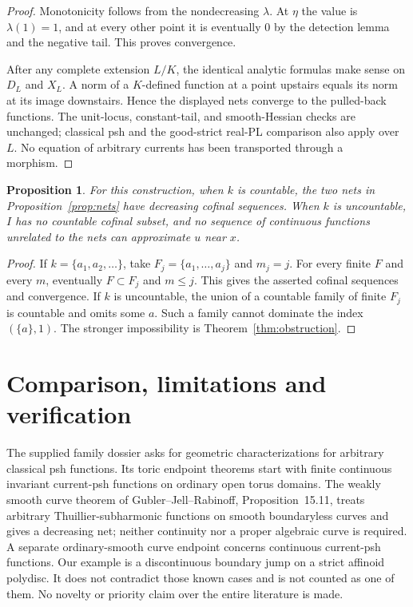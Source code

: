 \documentclass[11pt]{article}
\newtheorem{proposition}[theorem]{Proposition}
\begin{document}
\begin{proof}
Monotonicity follows from the nondecreasing $\lambda$. At $\eta$ the
value is $\lambda(1)=1$, and at every other point it is eventually $0$
by the detection lemma and the negative tail. This proves convergence.

After any complete extension $L/K$, the identical analytic formulas
make sense on $D_L$ and $X_L$. A norm of a $K$-defined function at a
point upstairs equals its norm at its image downstairs. Hence the
displayed nets converge to the pulled-back functions. The unit-locus,
constant-tail, and smooth-Hessian checks are unchanged; classical psh
and the good-strict real-PL comparison also apply over $L$. No equation
of arbitrary currents has been transported through a morphism.
\end{proof}

\begin{proposition}\label{prop:threshold}
For this construction, when $k$ is countable, the two nets in
Proposition~\ref{prop:nets} have decreasing cofinal sequences. When $k$
is uncountable, $I$ has no countable cofinal subset, and no sequence of
continuous functions unrelated to the nets can approximate $u$ near $x$.
\end{proposition}
\begin{proof}
If $k=\{a_1,a_2,\ldots\}$, take $F_j=\{a_1,\ldots,a_j\}$ and $m_j=j$.
For every finite $F$ and every $m$, eventually $F\subset F_j$ and
$m\le j$. This gives the asserted cofinal sequences and convergence.
If $k$ is uncountable, the union of a countable family of finite $F_j$
is countable and omits some $a$. Such a family cannot dominate the
index $(\{a\},1)$. The stronger impossibility is
Theorem~\ref{thm:obstruction}.
\end{proof}

\section{Comparison, limitations and verification}
The supplied family dossier asks for geometric characterizations for
arbitrary classical psh functions. Its toric endpoint theorems start
with finite continuous invariant current-psh functions on ordinary open
torus domains. The weakly smooth curve theorem of Gubler--Jell--Rabinoff,
Proposition~15.11, treats arbitrary Thuillier-subharmonic functions on
smooth boundaryless curves and gives a decreasing net; neither continuity
nor a proper algebraic curve is required. A separate ordinary-smooth
curve endpoint concerns continuous current-psh functions.
Our example is a discontinuous boundary jump on a strict affinoid
polydisc. It does not contradict those known cases and is not counted
as one of them. No novelty or priority claim over the entire literature
is made.
\end{document}
